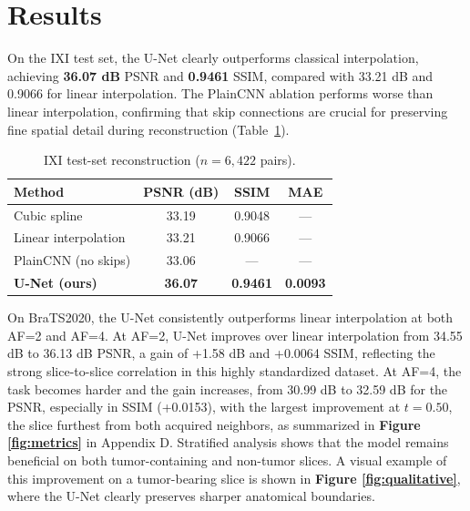 \documentclass{article}
\begin{document}
\section{Results}

On the IXI test set, the U-Net clearly outperforms classical interpolation, achieving \textbf{36.07 dB} PSNR and \textbf{0.9461} SSIM, compared with 33.21 dB and 0.9066 for linear interpolation. The PlainCNN ablation performs worse than linear interpolation, confirming that skip connections are crucial for preserving fine spatial detail during reconstruction (Table~\ref{tab:ixi}).

\begin{table}[h]
\centering
\caption{IXI test-set reconstruction (\(n=6,422\) pairs).}
\label{tab:ixi}
\begin{tabular}{lccc}
\toprule
Method                & PSNR (dB)      & SSIM            & MAE              \\
\midrule
Cubic spline          & 33.19          & 0.9048          & ---              \\
Linear interpolation  & 33.21          & 0.9066          & ---              \\
PlainCNN (no skips)   & 33.06          & ---             & ---              \\
\textbf{U-Net (ours)} & \textbf{36.07} & \textbf{0.9461} & \textbf{0.0093}  \\
\bottomrule
\end{tabular}
\end{table}

On BraTS2020, the U-Net consistently outperforms linear interpolation at both AF=2 and AF=4. At AF=2, U-Net improves over linear interpolation from 34.55 dB to 36.13 dB PSNR, a gain of +1.58 dB and +0.0064 SSIM, reflecting the strong slice-to-slice correlation in this highly standardized dataset. At AF=4, the task becomes harder and the gain increases, from 30.99 dB to 32.59 dB for the PSNR, especially in SSIM (+0.0153), with the largest improvement at \(t=0.50\), the slice furthest from both acquired neighbors, as summarized in \textbf{Figure \ref{fig:metrics}} in Appendix D. Stratified analysis shows that the model remains beneficial on both tumor-containing and non-tumor slices. A visual example of this improvement on a tumor-bearing slice is shown in \textbf{Figure \ref{fig:qualitative}}, where the U-Net clearly preserves sharper anatomical boundaries.
\end{document}
